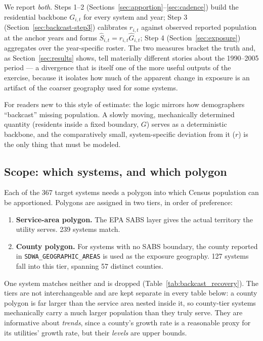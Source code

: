 \documentclass[11pt]{article}
\begin{document}
We report \emph{both}. Steps 1--2 (Sections~\ref{sec:apportion}--\ref{sec:cadence})
build the residential backbone $G_{i,t}$ for every system and year; Step 3
(Section~\ref{sec:backcast-step3}) calibrates $r_{i,t}$ against observed
reported population at the anchor years and forms
$\hat S_{i,t}=\hat r_{i,t}\hat G_{i,t}$; Step 4 (Section~\ref{sec:exposure})
aggregates over the year-specific roster. The two measures bracket the truth
and, as Section~\ref{sec:results} shows, tell materially different stories
about the 1990--2005 period --- a divergence that is itself one of the more
useful outputs of the exercise, because it isolates how much of the apparent
change in exposure is an artifact of the coarser geography used for some
systems.

For readers new to this style of estimate: the logic mirrors how demographers
``backcast'' missing population. A slowly moving, mechanically determined
quantity (residents inside a fixed boundary, $G$) serves as a deterministic
backbone, and the comparatively small, system-specific deviation from it
($r$) is the only thing that must be modeled.

\subsection{Scope: which systems, and which polygon}
\label{sec:scope}

Each of the 367 target systems needs a polygon into which Census population
can be apportioned. Polygons are assigned in two tiers, in order of
preference:
\begin{enumerate}[leftmargin=2em]
  \item \textbf{Service-area polygon.} The EPA SABS layer gives the actual
    territory the utility serves. 239 systems match.
  \item \textbf{County polygon.} For systems with no SABS boundary, the county
    reported in \texttt{SDWA\allowbreak\_GEOGRAPHIC\allowbreak\_AREAS} is used
    as the exposure geography. 127 systems fall into this tier, spanning 57
    distinct counties.
\end{enumerate}
One system matches neither and is dropped (Table~\ref{tab:backcast_recovery}).
The tiers are not interchangeable and are kept separate in every table below:
a county polygon is far larger than the service area nested inside it, so
county-tier systems mechanically carry a much larger population than they
truly serve. They are informative about \emph{trends}, since a county's growth
rate is a reasonable proxy for its utilities' growth rate, but their
\emph{levels} are upper bounds.
\end{document}
